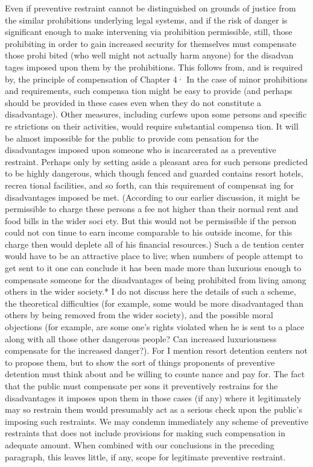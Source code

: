 \documentclass[11pt,openany]{book}
\begin{document}
Even if preventive restraint cannot be distinguished on grounds of justice from the similar prohibitions underlying legal systems, and if the risk of danger is significant enough to make intervening via prohibition permissible, still, those prohibiting in order to gain increased security for themselves must compensate those prohi bited (who well might not actually harm anyone) for the disadvan tages imposed upon them by the prohibitions. This follows from, and is required by, the principle of compensation of Chapter 4· In the case of minor prohibitions and requirements, such compensa tion might be easy to provide (and perhaps should be provided in these cases even when they do not constitute a disadvantage). Other measures, including curfews upon some persons and specific re strictions on their activities, would require substantial compensa tion. It will be almost impossible for the public to provide com pensation for the disadvantages imposed upon someone who is incarcerated as a preventive restraint. Perhaps only by setting aside a pleasant area for such persons predicted to be highly dangerous, which though fenced and guarded contains resort hotels, recrea tional facilities, and so forth, can this requirement of compensat ing for disadvantages imposed be met. (According to our earlier discussion, it might be permissible to charge these persons a fee not higher than their normal rent and food bills in the wider soci ety. But this would not be permissible if the person could not con tinue to earn income comparable to his outside income, for this charge then would deplete all of his financial resources.) Such a de tention center would have to be an attractive place to live; when numbers of people attempt to get sent to it one can conclude it has been made more than luxurious enough to compensate someone for the disadvantages of being prohibited from living among others in the wider society.* I do not discuss here the details of such a scheme, the theoretical difficulties (for example, some would be more disadvantaged than others by being removed from the wider society), and the possible moral objections (for example, are some one's rights violated when he is sent to a place along with all those other dangerous people? Can increased luxuriousness compensate for the increased danger?). For I mention resort detention centers not to propose them, but to show the sort of things proponents of preventive detention must think about and be willing to counte nance and pay for. The fact that the public must compensate per sons it preventively restrains for the disadvantages it imposes upon them in those cases (if any) where it legitimately may so restrain them would presumably act as a serious check upon the public's imposing such restraints. We may condemn immediately any scheme of preventive restraints that does not include provisions for making such compensation in adequate amount. When combined with our conclusions in the preceding paragraph, this leaves little, if any, scope for legitimate preventive restraint. 
\end{document}
